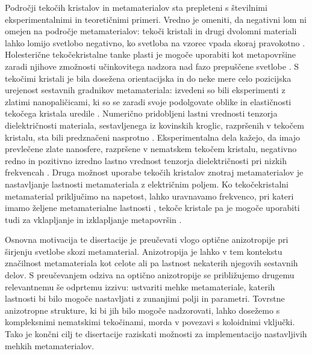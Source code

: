 \documentclass[a4paper,11pt]{article}
\begin{document}
Področji tekočih kristalov in metamaterialov sta prepleteni s številnimi eksperimentalnimi in teoretičnimi primeri. 
Vredno je omeniti, da negativni lom ni omejen na področje metamaterialov: tekoči kristali in drugi dvolomni materiali lahko lomijo svetlobo negativno, ko svetloba na vzorec vpada skoraj pravokotno \cite{lavrentovich-2006-lc-neg}. 
Holesterične tekočekristalne tanke plasti je mogoče uporabiti kot metapovršine zaradi njihove zmožnosti učinkovitega nadzora nad fazo prepuščene svetlobe \cite{ozaki-2016-patterned-lc}. 
S tekočimi kristali je bila dosežena orientacijska in do neke mere celo pozicijska urejenost sestavnih gradnikov metamateriala: izvedeni so bili eksperimenti z zlatimi nanopaličicami, ki so se zaradi svoje podolgovate oblike in elastičnosti tekočega kristala uredile \cite{lavrentovich-2008-gold-nanorods,smalyukh-2010-self-alignment,lavrentovich-2009-nanorods}. 
Numerično pridobljeni lastni vrednosti tenzorja dielektričnosti materiala, sestavljenega iz kovinskih kroglic, razpršenih v tekočem kristalu, sta bili predznačeni nasprotno \cite{xuan-2013-nanoparticle-lc,khoo-2014-nanoparticle-lc}. 
Eksperimentalna dela kažejo, da imajo prevlečene zlate nanosfere, razpršene v nematskem tekočem kristalu, negativno redno in pozitivno izredno lastno vrednost tenzorja dielektričnosti pri nizkih frekvencah \cite{goodby-2011-lc-gold-mtm}.
Druga možnost uporabe tekočih kristalov znotraj metamaterialov je nastavljanje lastnosti metamateriala z električnim poljem. 
Ko tekočekristalni metamaterial priključimo na napetost, lahko uravnavamo frekvenco, pri kateri imamo željene metamaterialne lastnosti \cite{zhang-2007-lc-mtm-tuning,shalaev-2007-tunable-lc,baets-2011-ring-resonators}, tekoče kristale pa je mogoče uporabiti tudi za vklapljanje in izklapljanje metapovršin \cite{buchnev-2015-lc-mtm-switch}. 

Osnovna motivacija te disertacije je preučevati vlogo optične anizotropije pri širjenju svetlobe skozi metamaterial. 
Anizotropija je lahko v tem kontekstu značilnost metamateriala kot celote ali pa lastnost nekaterih njegovih sestavnih delov. 
S preučevanjem odziva na optično anizotropije se približujemo drugemu relevantnemu še odprtemu izzivu: ustvariti mehke metamateriale, katerih lastnosti bi bilo mogoče nastavljati z zunanjimi polji in parametri. 
Tovrstne anizotropne strukture, ki bi jih bilo mogoče nadzorovati, lahko dosežemo s kompleksnimi nematskimi tekočinami, morda v povezavi s koloidnimi vključki.
Tako je končni cilj te disertacije raziskati možnosti za implementacijo nastavljivih mehkih metamaterialov.
\end{document}
